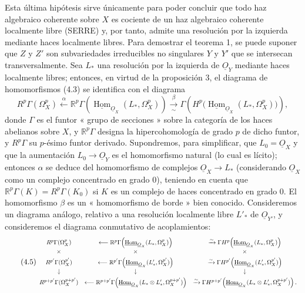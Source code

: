 \documentclass[11pt,twoside,openany]{book}
\numberwithin{equation}{section}
\newcommand{\Osh}{\underline{O}}
\newcommand{\Homsh}{\underline{\operatorname{Hom}}}
\theoremstyle{plain}
\theoremstyle{definition}
\theoremstyle{remark}
\theoremstyle{plain}
\theoremstyle{definition}
\theoremstyle{remark}
\begin{document}
Esta última hipótesis sirve únicamente para poder concluir que todo
haz algebraico coherente sobre $X$ es cociente de un haz algebraico
coherente localmente libre (SERRE) y, por tanto, admite una resolución por la izquierda mediante
haces localmente libres. Para demostrar el teorema 1, se puede suponer que
$Z$ y $Z'$ son subvariedades irreducibles no singulares $Y$ y $Y'$ que se
intersecan transversalmente. Sea $L_{*}$ una resolución por la izquierda de $\Osh_Y$ mediante
haces localmente libres; entonces, en virtud de la proposición 3, el diagrama
de homomorfismos (4.3) se identifica con el diagrama
\[
R^{p}\Gamma(\Omega_X^{p})
\xleftarrow{\alpha}
\mathbb R^{p}\Gamma\!\left(\Homsh_{\Osh_X}(L_{*},\Omega_X^{p})\right)
\xrightarrow[\sim]{\beta}
\Gamma\!\left(H^{p}\bigl(\Homsh_{\Osh_X}(L_{*},\Omega_X^{p})\bigr)\right),
\]
donde $\Gamma$ es el funtor « grupo de secciones » sobre la categoría de los
haces abelianos sobre $X$, y $\mathbb R^{p}\Gamma$ designa
la hipercohomología de grado $p$ de dicho funtor, y $R^{p}\Gamma$ su
$p$-ésimo funtor derivado. Supondremos, para simplificar, que $L_0=\Osh_X$ y que
la aumentación $L_0\longrightarrow\Osh_Y$ es el homomorfismo natural (lo cual
es lícito); entonces $\alpha$ se deduce del homomorfismo de complejos
$\Osh_X\longrightarrow L_{*}$ (considerando $\Osh_X$ como un complejo concentrado
en grado $0$), teniendo en cuenta que $\mathbb R^{p}\Gamma(K)=R^{p}\Gamma(K_0)$ si $K$
es un complejo de haces concentrado en grado $0$. El homomorfismo $\beta$ es un
« homomorfismo de borde » bien conocido. Consideremos un diagrama análogo, relativo a
una resolución localmente libre $L'_{*}$ de $\Osh_{Y'}$, y consideremos el
diagrama conmutativo de acoplamientos:
\begin{equation}\tag{4.5}
\resizebox{\textwidth}{!}{$
\begin{array}{ccc}
R^{p}\Gamma(\Omega_X^{p})
&\longleftarrow
\mathbb R^{p}\Gamma\!\left(\Homsh_{\Osh_X}(L_{*},\Omega_X^{p})\right)
&\xrightarrow{\sim}
\Gamma H^{p}\!\left(\Homsh_{\Osh_X}(L_{*},\Omega_X^{p})\right)
\\[3pt]
\times&\times&\times\\[3pt]
R^{p'}\Gamma(\Omega_X^{p'})
&\longleftarrow
\mathbb R^{p'}\Gamma\!\left(\Homsh_{\Osh_X}(L'_{*},\Omega_X^{p'})\right)
&\xrightarrow{\sim}
\Gamma H^{p'}\!\left(\Homsh_{\Osh_X}(L'_{*},\Omega_X^{p'})\right)
\\[3pt]
\downarrow&\downarrow&\downarrow\\[3pt]
R^{p+p'}\Gamma(\Omega_X^{p+p'})
&\longleftarrow
\mathbb R^{p+p'}\Gamma\!\left(
\Homsh_{\Osh_X}(L_{*}\otimes L'_{*},\Omega_X^{p+p'})\right)
&\xrightarrow{\sim}
\Gamma H^{p+p'}\!\left(
\Homsh_{\Osh_X}(L_{*}\otimes L'_{*},\Omega_X^{p+p'})\right).
\end{array}
$}
\end{equation}
\end{document}
